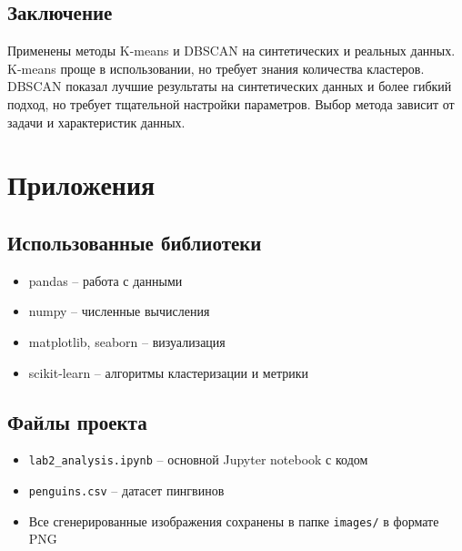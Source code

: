\documentclass[12pt,a4paper]{report}
\begin{document}
\section{Заключение}

Применены методы K-means и DBSCAN на синтетических и реальных данных. K-means проще в использовании, но требует знания количества кластеров. DBSCAN показал лучшие результаты на синтетических данных и более гибкий подход, но требует тщательной настройки параметров. Выбор метода зависит от задачи и характеристик данных.

\chapter*{Приложения}

\section*{Использованные библиотеки}

\begin{itemize}
    \item pandas -- работа с данными
    \item numpy -- численные вычисления
    \item matplotlib, seaborn -- визуализация
    \item scikit-learn -- алгоритмы кластеризации и метрики
\end{itemize}

\section*{Файлы проекта}

\begin{itemize}
    \item \texttt{lab2\_analysis.ipynb} -- основной Jupyter notebook с кодом
    \item \texttt{penguins.csv} -- датасет пингвинов
    \item Все сгенерированные изображения сохранены в папке \texttt{images/} в формате PNG
\end{itemize}
\end{document}
